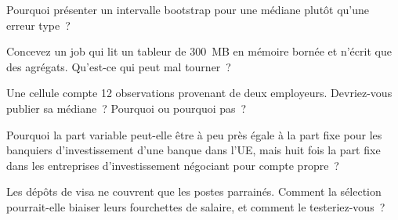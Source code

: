 \begin{interviewq}\label{iq:in:pay-levels-by-role-firm-type-and-seniority:2}
Pourquoi présenter un intervalle bootstrap pour une médiane plutôt qu'une erreur type~?
\end{interviewq}

\begin{interviewq}\label{iq:in:pay-levels-by-role-firm-type-and-seniority:3}
Concevez un job qui lit un tableur de 300~MB en mémoire bornée et n'écrit que des agrégats. Qu'est-ce qui peut mal tourner~?
\end{interviewq}

\begin{interviewq}\label{iq:in:pay-levels-by-role-firm-type-and-seniority:4}
Une cellule compte 12 observations provenant de deux employeurs. Devriez-vous publier sa médiane~? Pourquoi ou pourquoi pas~?
\end{interviewq}

\begin{interviewq}\label{iq:in:pay-levels-by-role-firm-type-and-seniority:5}
Pourquoi la part variable peut-elle être à peu près égale à la part fixe pour les banquiers d'investissement d'une banque dans l'UE,
mais huit fois la part fixe dans les entreprises d'investissement négociant pour compte propre~?
\end{interviewq}

\begin{interviewq}\label{iq:in:pay-levels-by-role-firm-type-and-seniority:6}
Les dépôts de visa ne couvrent que les postes parrainés. Comment la sélection pourrait-elle biaiser leurs fourchettes de salaire, et comment le testeriez-vous~?
\end{interviewq}
